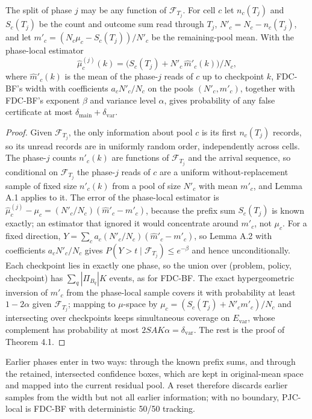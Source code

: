 \documentclass[sigconf,anonymous,review]{acmart}
\newcommand{\dmain}{\delta_{\text{main}}}
\newcommand{\dvar}{\delta_{\text{var}}}
\begin{document}
\begin{proposition}\label{prop:pjclocal}
The split of phase $j$ may be any function of $\mathcal{F}_{T_j}$. For cell $c$ let $n_c(T_j)$ and $S_c(T_j)$ be the count and outcome sum read through $T_j$, $N'_c = N_c - n_c(T_j)$, and let $m'_c = (N_c\mu_c - S_c(T_j))/N'_c$ be the remaining-pool mean. With the phase-local estimator
\[
\hat\mu^{(j)}_c(k) = \bigl(S_c(T_j) + N'_c\,\hat m'_c(k)\bigr)/N_c,
\]
where $\hat m'_c(k)$ is the mean of the phase-$j$ reads of $c$ up to checkpoint $k$, FDC-BF's width with coefficients $a_c N'_c/N_c$ on the pools $(N'_c, m'_c)$, together with FDC-BF's exponent $\beta$ and variance level $\alpha$, gives probability of any false certificate at most $\dmain + \dvar$.
\end{proposition}
\begin{proof}
Given $\mathcal{F}_{T_j}$, the only information about pool $c$ is its first $n_c(T_j)$ records, so its unread records are in uniformly random order, independently across cells. The phase-$j$ counts $n'_c(k)$ are functions of $\mathcal{F}_{T_j}$ and the arrival sequence, so conditional on $\mathcal{F}_{T_j}$ the phase-$j$ reads of $c$ are a uniform without-replacement sample of fixed size $n'_c(k)$ from a pool of size $N'_c$ with mean $m'_c$, and Lemma A.1 applies to it. The error of the phase-local estimator is $\hat\mu^{(j)}_c - \mu_c = (N'_c/N_c)(\hat m'_c - m'_c)$, because the prefix sum $S_c(T_j)$ is known exactly; an estimator that ignored it would concentrate around $m'_c$, not $\mu_c$. For a fixed direction, $Y = \sum_c a_c(N'_c/N_c)(\hat m'_c - m'_c)$, so Lemma A.2 with coefficients $a_c N'_c/N_c$ gives $P(Y > t \mid \mathcal{F}_{T_j}) \le e^{-\beta}$ and hence unconditionally. Each checkpoint lies in exactly one phase, so the union over (problem, policy, checkpoint) has $\sum_q|\Pi_{B_q}|K$ events, as for FDC-BF. The exact hypergeometric inversion of $m'_c$ from the phase-local sample covers it with probability at least $1-2\alpha$ given $\mathcal{F}_{T_j}$; mapping to $\mu$-space by $\mu_c = (S_c(T_j) + N'_c m'_c)/N_c$ and intersecting over checkpoints keeps simultaneous coverage on $E_{\text{var}}$, whose complement has probability at most $2SAK\alpha = \dvar$. The rest is the proof of Theorem 4.1.
\end{proof}

\noindent Earlier phases enter in two ways: through the known prefix sums, and through the retained, intersected confidence boxes, which are kept in original-mean space and mapped into the current residual pool. A reset therefore discards earlier samples from the width but not all earlier information; with no boundary, PJC-local is FDC-BF with deterministic 50/50 tracking.
\end{document}
